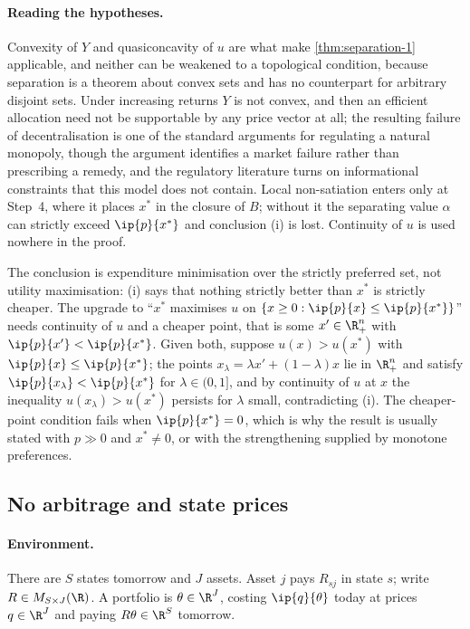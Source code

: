 \paragraph{Reading the hypotheses.} Convexity of $Y$ and quasiconcavity of $u$
are what make \autoref{thm:separation-1} applicable, and neither can be weakened
to a topological condition, because separation is a theorem about convex sets and
has no counterpart for arbitrary disjoint sets. Under increasing returns $Y$ is
not convex, and then an efficient allocation need not be supportable by any price
vector at all; the resulting failure of decentralisation is one of the standard
arguments for regulating a natural monopoly, though the argument identifies a
market failure rather than prescribing a remedy, and the regulatory literature
turns on informational constraints that this model does not contain. Local
non-satiation enters only at Step~4, where it places $x^\ast$ in the closure of
$B$; without it the separating value $\alpha$ can strictly exceed
$\ip{p}{x^\ast}$ and conclusion (i) is lost. Continuity of $u$ is used nowhere in
the proof.

The conclusion is expenditure minimisation over the strictly preferred set, not
utility maximisation: (i) says that nothing strictly better than $x^\ast$ is
strictly cheaper. The upgrade to ``$x^\ast$ maximises $u$ on
$\{x\geq0 : \ip{p}{x}\leq\ip{p}{x^\ast}\}$'' needs continuity of $u$ and a
cheaper point, that is some $x'\in\R^n_+$ with $\ip{p}{x'}<\ip{p}{x^\ast}$.
Given both, suppose $u(x)>u(x^\ast)$ with $\ip{p}{x}\leq\ip{p}{x^\ast}$; the
points $x_\lambda=\lambda x'+(1-\lambda)x$ lie in $\R^n_+$ and satisfy
$\ip{p}{x_\lambda}<\ip{p}{x^\ast}$ for $\lambda\in(0,1]$, and by continuity of
$u$ at $x$ the inequality $u(x_\lambda)>u(x^\ast)$ persists for $\lambda$ small,
contradicting (i). The cheaper-point condition fails
when $\ip{p}{x^\ast}=0$, which is why the result is usually stated with
$p\gg0$ and $x^\ast\neq0$, or with the strengthening supplied by monotone
preferences.

\subsection{No arbitrage and state prices}\label{subsec:cvx-arbitrage}

\paragraph{Environment.} There are $S$ states tomorrow and $J$ assets. Asset $j$
pays $R_{sj}$ in state $s$; write $R\in M_{S\times J}(\R)$. A portfolio is
$\theta\in\R^J$, costing $\ip{q}{\theta}$ today at prices $q\in\R^J$ and paying
$R\theta\in\R^S$ tomorrow.

